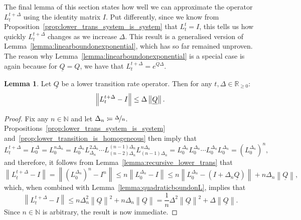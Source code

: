\documentclass[10pt,a4paper]{paper}
\theoremstyle{definition}
\newtheorem{lemma}[theorem]{Lemma}
\newcommand{\nats}{\mathbb{N}}
\newcommand{\reals}{\mathbb{R}}
\newcommand{\realsnonneg}{\reals_{\geq 0}}
\newcommand{\lrate}{\underline{Q}}
\newcommand{\norm}[1]{\left\lVert #1 \right\rVert}
\newcommand{\coloneqq}{:\!=}
\begin{document}
The final lemma of this section states how well we can approximate the operator $L_t^{t+\Delta}$ using the identity matrix $I$. Put differently, since we know from Proposition~\ref{prop:lower_trans_system_is_system} that $L_t^t=I$, this tells us how quickly $L_t^{t+\Delta}$ changes as we increase $\Delta$. This result is a generalised version of Lemma~\ref{lemma:linearboundonexponential}, which has so far remained unproven. The reason why Lemma~\ref{lemma:linearboundonexponential} is a special case is again because for $\lrate=Q$, we have that $L_t^{t+\Delta}=e^{Q\Delta}$.

\begin{lemma}\label{lemma:linearboundonL}
Let $\lrate$ be a lower transition rate operator. Then for any $t,\Delta\in\realsnonneg$:
\begin{equation*}
\norm{L_t^{t+\Delta}-I}\leq\Delta\norm{\lrate}.\vspace{5pt}
\end{equation*}
\end{lemma}
\begin{proof}
Fix any $n\in\nats$ and let $\Delta_n\coloneqq\nicefrac{\Delta}{n}$. Propositions~\ref{prop:lower_trans_system_is_system} and~\ref{prop:lower_transition_is_homogeneous} then imply that
\begin{equation*}
L_t^{t+\Delta}
=L_0^{\Delta}
=L_0^{n\Delta_n}
=L_0^{\Delta_n}
L_{\Delta_n}^{2\Delta_n}
\cdots
L_{(n-2)\Delta_n}^{(n-1)\Delta_n}
L_{(n-1)\Delta_n}^{n\Delta_n}
=L_0^{\Delta_n}
L_0^{\Delta_n}
\cdots
L_0^{\Delta_n}
L_0^{\Delta_n}
=(L_0^{\Delta_n})^n,
\end{equation*}
and therefore, it follows from Lemma~\ref{lemma:recursive_lower_trans} that
\begin{equation*}
\norm{L_t^{t+\Delta}-I}
=
\norm{(L_0^{\Delta_n})^n-I^n}
\leq n\norm{L_0^{\Delta_n}-I}
\leq n\norm{L_0^{\Delta_n}-(I+\Delta_n\lrate)}+n\Delta_n\norm{\lrate},
\end{equation*}
which, when combined with Lemma~\ref{lemma:quadraticboundonL}, implies that
\begin{equation*}
\norm{L_t^{t+\Delta}-I}
\leq
n\Delta_n^2\norm{\lrate}^2+n\Delta_n\norm{\lrate}
=\frac{1}{n}\Delta^2\norm{\lrate}^2+\Delta\norm{\lrate}.
\end{equation*}
Since $n\in\nats$ is arbitrary, the result is now immediate.
\end{proof}
\end{document}
